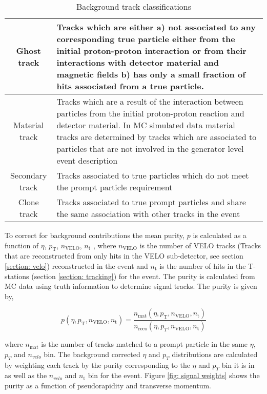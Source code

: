 \begin{table}[htdp]
	\caption{Background track classifications}
		\begin{center}
			\begin{tabular}{|c|p{}|}
				\hline
				Ghost track & Tracks which are either a) not associated to any corresponding true particle either from the initial proton-proton interaction or from their interactions with detector material and magnetic fields b) has only a small fraction of hits associated from a true particle.  \\
				\hline
				 Material track & Tracks which are a result of the interaction between particles from the initial proton-proton reaction and detector material. In MC simulated data material tracks are determined by tracks which are associated to particles that are not involved in the generator level event description \\
				 \hline
				 Secondary track & Tracks associated to true particles which do not meet the prompt particle requirement \\
				 \hline
				 Clone track & Tracks associated to true prompt particles and share the same association with other tracks in the event \\
				\hline
			\end{tabular}
		\end{center}
	\label{table: background track classifications}
\end{table}%

To correct for background contributions the mean purity, $p$ is calculated as a function of $\eta$, $p_\mathrm{T}$, $n_\mathrm{VELO}$, $n_\mathrm{t}$ , where $n_\mathrm{VELO}$ is the number of VELO tracks (Tracks that are reconstructed from only hits in the VELO sub-detector, see section \ref{section: velo}) reconstructed in the event and $n_\mathrm{t}$ is the number of hits in the T-stations (section \ref{section: tracking}) for the event. The purity is calculated from MC data using truth information to determine signal tracks. The purity is given by,

\begin{equation}
	p(\eta, p_\mathrm{T}, n_\mathrm{VELO}, n_\mathrm{t}) = \frac{n_\mathrm{mat}(\eta, p_\mathrm{T}, n_\mathrm{VELO}, n_\mathrm{t})}{n_\mathrm{reco}(\eta, p_T, n_\mathrm{VELO}, n_\mathrm{t})}
\end{equation}

where $n_\mathrm{mat}$ is the number of tracks matched to a prompt particle in the same $\eta$, $p_T$ and $n_{velo}$ bin. The background corrected $\eta$ and $p_T$ distributions are calculated by weighting each track by the purity corresponding to the $\eta$ and $p_T$ bin it is in as well as the $n_{velo}$ and $n_\mathrm{t}$ bin for the event. Figure \ref{fig: signal weights} shows the purity as a function of pseudorapidity and transverse momentum.

